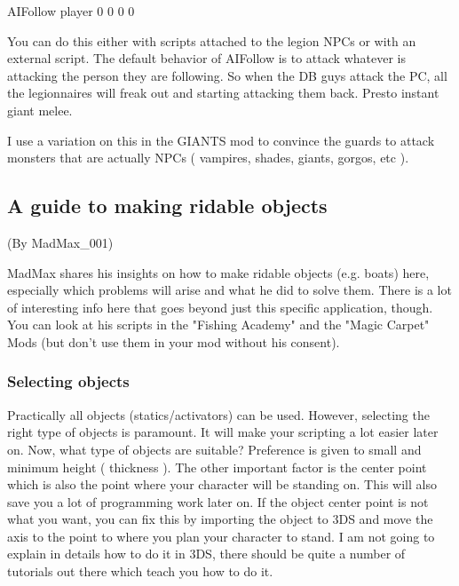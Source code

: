 \documentclass[
]{article}
\begin{document}
AIFollow player 0 0 0 0

You can do this either with scripts attached to the legion NPCs or with
an external script. The default behavior of AIFollow is to attack
whatever is attacking the person they are following. So when the DB guys
attack the PC, all the legionnaires will freak out and starting
attacking them back. Presto instant giant melee.

I use a variation on this in the GIANTS mod to convince the guards to
attack monsters that are actually NPCs ( vampires, shades, giants,
gorgos, etc ).

\hypertarget{a-guide-to-making-ridable-objects}{%
\subsection{\texorpdfstring{\hfill\break
A guide to making ridable
objects}{ A guide to making ridable objects}}\label{a-guide-to-making-ridable-objects}}

(By MadMax\_001)

MadMax shares his insights on how to make ridable objects (e.g. boats)
here, especially which problems will arise and what he did to solve
them. There is a lot of interesting info here that goes beyond just this
specific application, though. You can look at his scripts in the
"Fishing Academy" and the "Magic Carpet" Mods (but don't use them in
your mod without his consent).

\hypertarget{selecting-objects}{%
\subsubsection{\texorpdfstring{Selecting objects
}{Selecting objects }}\label{selecting-objects}}

Practically all objects (statics/activators) can be used. However,
selecting the right type of objects is paramount. It will make your
scripting a lot easier later on. Now, what type of objects are suitable?
Preference is given to small and minimum height ( thickness ). The other
important factor is the center point which is also the point where your
character will be standing on. This will also save you a lot of
programming work later on. If the object center point is not what you
want, you can fix this by importing the object to 3DS and move the axis
to the point to where you plan your character to stand. I am not going
to explain in details how to do it in 3DS, there should be quite a
number of tutorials out there which teach you how to do it.
\end{document}
